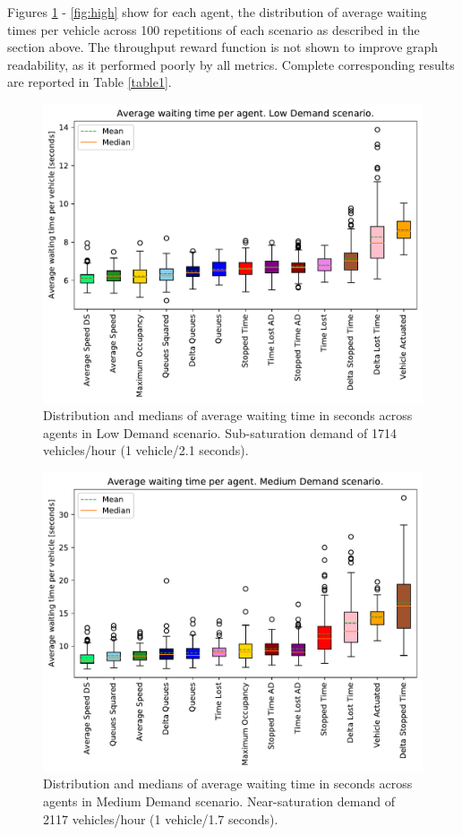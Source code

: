 \documentclass[conference]{IEEEtran}
\begin{document}
Figures \ref{fig:low} - \ref{fig:high} show for each agent, the distribution of average waiting times per vehicle across 100 repetitions of each scenario as described in the section above.
The throughput reward function is not shown to improve graph readability, as it performed poorly by all metrics. 
Complete corresponding results are reported in Table \ref{table1}.
\begin{figure}[thpb]
    \centering
    \includegraphics[width=\linewidth]{figures/rand_2_1_ordered_color_DS.pdf}
    \caption{Distribution and medians of average waiting time in seconds across agents in Low Demand scenario. Sub-saturation demand of 1714 vehicles/hour (1 vehicle/2.1 seconds).}
    \label{fig:low}
\end{figure}

\begin{figure}[thpb]
    \centering
    \includegraphics[width=\linewidth]{figures/rand_1_7_ordered_color_DS.pdf}
    \caption{Distribution and medians of average waiting time in seconds across agents in Medium Demand scenario. Near-saturation demand of 2117 vehicles/hour (1 vehicle/1.7 seconds).}
    \label{fig:mid}
\end{figure}
\end{document}

